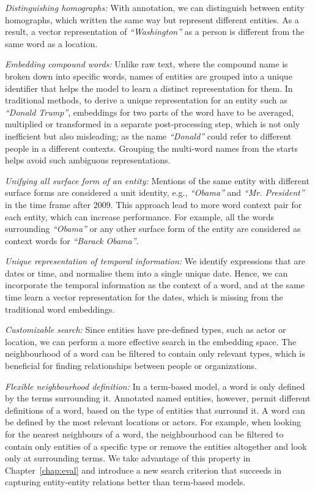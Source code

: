 \begin{compactitem}
\item \emph{Distinguishing homographs:} With annotation, we can distinguish between entity homographs, which written the same way but represent different entities. As a result, a vector representation of \emph{``Washington''} as a person is different from the same word as a location. 
\item \emph{Embedding compound words:}  Unlike raw text, where the compound name is broken down into specific words, names of entities are grouped into a unique identifier that helps the model to learn a distinct representation for them. In traditional methods, to derive a unique representation for an entity such as \emph{``Donald Trump''}, embeddings for two parts of the word have to be averaged, multiplied or transformed in a separate post-processing step, which is not only inefficient but also misleading; as the name \emph{``Donald''} could refer to different people in a different contexts. Grouping the multi-word names from the starts helps avoid such ambiguous representations. 
\item \emph{Unifying all surface form of an entity:} Mentions of the same entity with different surface forms are considered a unit identity, e.g., \emph{``Obama''} and \emph{``Mr. President''} in the time frame after $2009$. This approach lead to more  word context pair for each entity, which can increase performance. For example, all the words surrounding \emph{``Obama''} or any other surface form of the entity are considered as context words for \emph{``Barack Obama''}. 
\item \emph{Unique representation of temporal information:} We identify expressions that are dates or time, and normalise them into a single unique date. Hence, we can incorporate the temporal information as the context of a word, and at the same time learn a vector representation for the dates, which is missing from the traditional word embeddings. 
\item \emph{Customizable search:} Since entities have pre-defined types, such as actor or location, we can perform a more effective search in the embedding space. The neighbourhood of a word can be filtered to contain only relevant types, which is beneficial for finding relationships between people or organizations. 
\item \emph{Flexible neighbourhood definition:} In a term-based model, a word is only defined by the terms surrounding it.  Annotated named entities, however, permit different definitions of a word, based on the type of entities that surround it.
A word can be defined by the most relevant locations or actors. For example, when looking for the nearest neighbours of a word, the neighbourhood can be filtered to contain only entities of a specific type or remove the entities altogether and look only at surrounding terms. We take advantage of this property in Chapter~\ref{chap:eval} and introduce a new search criterion that succeeds in capturing entity-entity relations better than term-based models.\\
\end{compactitem}
